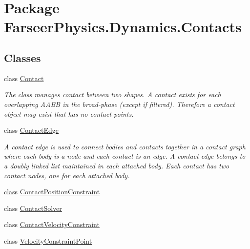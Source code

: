\hypertarget{namespace_farseer_physics_1_1_dynamics_1_1_contacts}{\section{Package Farseer\+Physics.\+Dynamics.\+Contacts}
\label{namespace_farseer_physics_1_1_dynamics_1_1_contacts}
}
\subsection*{Classes}
\begin{DoxyCompactItemize}
\item 
class \hyperlink{class_farseer_physics_1_1_dynamics_1_1_contacts_1_1_contact}{Contact}
\begin{DoxyCompactList}\small\item\em The class manages contact between two shapes. A contact exists for each overlapping A\+A\+B\+B in the broad-\/phase (except if filtered). Therefore a contact object may exist that has no contact points. \end{DoxyCompactList}\item 
class \hyperlink{class_farseer_physics_1_1_dynamics_1_1_contacts_1_1_contact_edge}{Contact\+Edge}
\begin{DoxyCompactList}\small\item\em A contact edge is used to connect bodies and contacts together in a contact graph where each body is a node and each contact is an edge. A contact edge belongs to a doubly linked list maintained in each attached body. Each contact has two contact nodes, one for each attached body. \end{DoxyCompactList}\item 
class \hyperlink{class_farseer_physics_1_1_dynamics_1_1_contacts_1_1_contact_position_constraint}{Contact\+Position\+Constraint}
\item 
class \hyperlink{class_farseer_physics_1_1_dynamics_1_1_contacts_1_1_contact_solver}{Contact\+Solver}
\item 
class \hyperlink{class_farseer_physics_1_1_dynamics_1_1_contacts_1_1_contact_velocity_constraint}{Contact\+Velocity\+Constraint}
\item 
class \hyperlink{class_farseer_physics_1_1_dynamics_1_1_contacts_1_1_velocity_constraint_point}{Velocity\+Constraint\+Point}
\end{DoxyCompactItemize}
